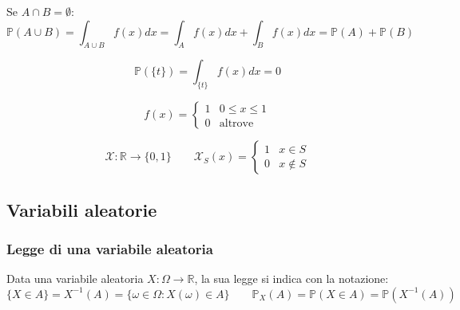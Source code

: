 \begin{proposition}
	Se $A \cap B = \emptyset$:
	\begin{equation}
		\mathbb{P}(A \cup B) = \int_{A \cup B} f(x)dx = \int_{A} f(x)dx + \int_{B} f(x)dx = \mathbb{P}(A) + \mathbb{P}(B)
	\end{equation}
\end{proposition}

\begin{proposition}
	\begin{equation}
		\mathbb{P}(\{t\}) = \int_{\{t\}} f(x)dx=0
	\end{equation}
\end{proposition}

\begin{definition}
	\begin{equation}
		f(x) = \begin{cases}
			1 & 0 \leq x \leq 1 \\
			0 & \text{altrove}
		\end{cases}
	\end{equation}
\end{definition}

\begin{definition}
	\begin{equation}
		\mathcal{X}: \mathbb{R} \to \{0,1\} \quad\quad \mathcal{X}_S(x) = \begin{cases}
			1 & x \in S \\
			0 & x \notin S
		\end{cases}
	\end{equation}
\end{definition}

\subsection{Variabili aleatorie}
\subsubsection{Legge di una variabile aleatoria}
\begin{definition}
	Data una variabile aleatoria $X: \Omega \to \mathbb{R}$, la sua legge si indica con la notazione:
	\begin{equation*}
		\{X \in A\} = X^{-1}(A) = \{\omega \in \Omega : X(\omega) \in A\} \quad\quad \mathbb{P}_X(A) = \mathbb{P}(X \in A) = \mathbb{P}(X^{-1}(A))
	\end{equation*}
\end{definition}

